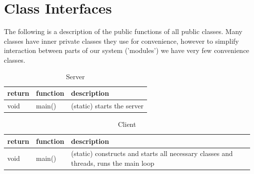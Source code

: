 \section{Class Interfaces}
The following is a description of the public functions of all public classes.
Many classes have inner private classes they use for convenience, however to
simplify interaction between parts of our system ('modules') we have very few
convenience classes.

\begin{table}[h]
    \centering
    \begin{tabular}{p{1cm}p{1cm}p{3cm}}
    return & function & description\\ \hline
    void   & main() & (static) starts the server\\
    \end{tabular}
    \caption{Server}
\end{table}

\begin{table}[h]
    \centering
    \begin{tabular}{p{1cm}p{1cm}p{9cm}}
    return & function & description\\ \hline
    void   & main()   & (static) constructs and starts all necessary classes and threads, runs the main loop\\
    \end{tabular}
    \caption{Client}
\end{table}

